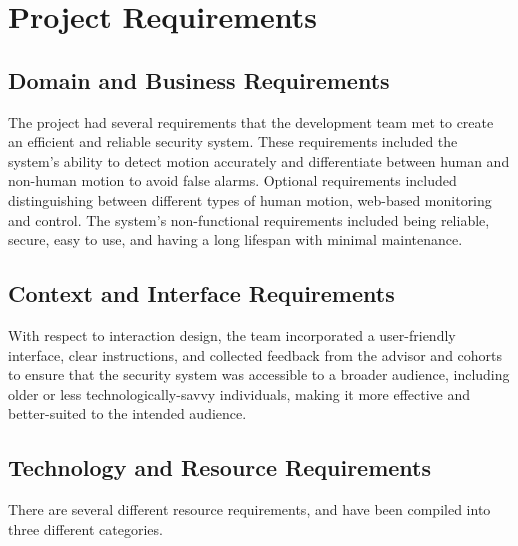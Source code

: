 \section{Project Requirements}\label{sec:project-requirements}

\subsection{Domain and Business Requirements}\label{subsec:domain-and-business-requirements}
The \brand{} project had several requirements that the development team met to
create an efficient and reliable security system. %
These requirements included the system's ability to detect motion accurately and differentiate between human and
non-human motion to avoid false alarms. %
Optional requirements included distinguishing between different types of human motion, web-based monitoring and control. %
The system's non-functional requirements included being reliable, secure,
easy to use, and having a long lifespan with minimal maintenance. %

\subsection{Context and Interface Requirements}\label{subsec:context-and-interface-requirements}

With respect to interaction design, the team incorporated a user-friendly interface, clear
instructions, and collected feedback from the advisor and cohorts to ensure that the
security system was accessible to a broader audience, including older or less
technologically-savvy individuals, making it more effective and better-suited to the
intended audience. %

\subsection{Technology and Resource Requirements}\label{subsec:technology-and-resource-requirements}

There are several different resource requirements, and have been compiled into three
different categories.%

